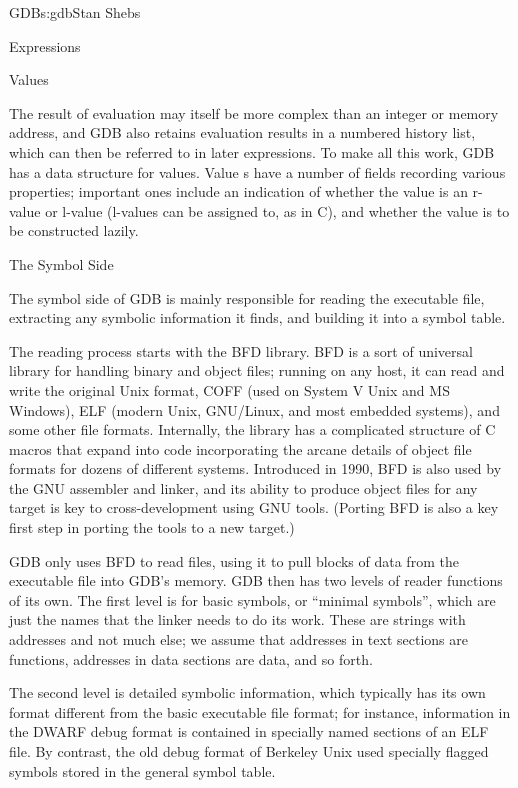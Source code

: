 \begin{aosachapter}{GDB}{s:gdb}{Stan Shebs}
\begin{aosasect2}{Expressions}
\end{aosasect2}

\begin{aosasect2}{Values}

The result of evaluation may itself be more complex than an integer or
memory address, and GDB also retains evaluation results in a numbered
history list, which can then be referred to in later expressions.  To
make all this work, GDB has a data structure for values.  Value
s have a number of fields recording various properties;
important ones include an indication of whether the value is an
r-value or l-value (l-values can be assigned to, as in C), and whether
the value is to be constructed lazily.

\end{aosasect2}

\begin{aosasect1}{The Symbol Side}

The symbol side of GDB is mainly responsible for reading the
executable file, extracting any symbolic information it finds, and
building it into a symbol table.

The reading process starts with the BFD library.  BFD is a sort of
universal library for handling binary and object files; running on any
host, it can read and write the original Unix  format,
COFF (used on System V Unix and MS Windows), ELF (modern Unix,
GNU/Linux, and most embedded systems), and some other file formats.
Internally, the library has a complicated structure of C macros that
expand into code incorporating the arcane details of object file
formats for dozens of different systems.  Introduced in 1990, BFD is
also used by the GNU assembler and linker, and its ability to produce
object files for any target is key to cross-development using GNU
tools.  (Porting BFD is also a key first step in porting the tools to a
new target.)

GDB only uses BFD to read files, using it to pull blocks of data
from the executable file into GDB's memory. GDB then has two levels of
reader functions of its own. The first level is for basic symbols, or
``minimal symbols'', which are just the names that the linker needs to
do its work. These are strings with addresses and not much else; we
assume that addresses in text sections are functions, addresses
in data sections are data, and so forth.

The second level is detailed symbolic information, which typically has
its own format different from the basic executable file format; for
instance, information in the DWARF debug format is contained in
specially named sections of an ELF file.  By contrast, the old
 debug format of Berkeley Unix used specially flagged
symbols stored in the general symbol table.


\end{aosasect1}
\end{aosachapter}
